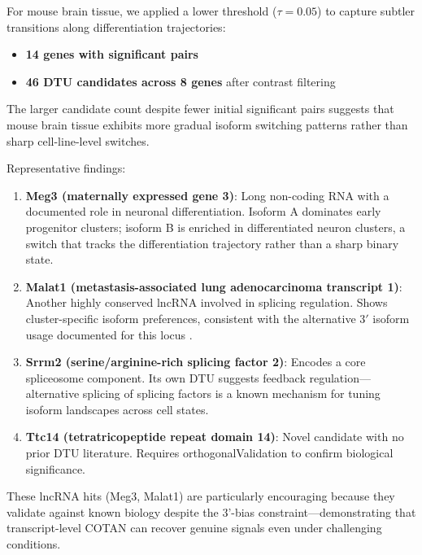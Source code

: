 For mouse brain tissue, we applied a lower threshold ($\tau = 0.05$) to capture subtler transitions along differentiation trajectories:
\begin{itemize}
    \item \textbf{14 genes with significant pairs}
    \item \textbf{46 DTU candidates across 8 genes} after contrast filtering
\end{itemize}

The larger candidate count despite fewer initial significant pairs suggests that mouse brain tissue exhibits more gradual isoform switching patterns rather than sharp cell-line-level switches.

Representative findings:
\begin{enumerate}
    \item \textbf{Meg3 (maternally expressed gene 3)}: Long non-coding RNA with a documented role in neuronal differentiation. Isoform A dominates early progenitor clusters; isoform B is enriched in differentiated neuron clusters, a switch that tracks the differentiation trajectory rather than a sharp binary state.
    
    \item \textbf{Malat1 (metastasis-associated lung adenocarcinoma transcript 1)}: Another highly conserved lncRNA involved in splicing regulation. Shows cluster-specific isoform preferences, consistent with the alternative 3$'$ isoform usage documented for this locus \cite{ghanam2023malat1}.

    \item \textbf{Srrm2 (serine/arginine-rich splicing factor 2)}: Encodes a core spliceosome component. Its own DTU suggests feedback regulation---alternative splicing of splicing factors is a known mechanism for tuning isoform landscapes across cell states.

    \item \textbf{Ttc14 (tetratricopeptide repeat domain 14)}: Novel candidate with no prior DTU literature. Requires \gls{orthogonalValidation} to confirm biological significance.
\end{enumerate}

These lncRNA hits (Meg3, Malat1) are particularly encouraging because they validate against known biology despite the 3'-bias constraint---demonstrating that transcript-level COTAN can recover genuine signals even under challenging conditions.

